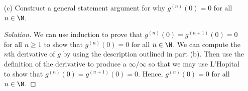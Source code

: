 \begin{enumerate}
\begin{proof}[Solution]
\begin{align*}
            g^{(2)}(x) &= \frac{ 2 e^{-1/x^{2}} }{ x^{6} }  ( 2 - 3x^2  ), \\
            g^{(3)}(x) &= \frac{ 2 e^{-1/x^{2}} }{ x^{9} } ( 4 - 18 x^{2} + 12x^{4} ).
        \end{align*}
        For our \( n \)th derivative, we have that for \( x \neq 0  \)
        \[  g^{(n)}(x) = 
        \begin{cases}
            \frac{ 2 e^{-1/x^{2}} }{ x^{3} } &\text{ if } n=1 \\
            \frac{ 2 e^{-1/x^2 } }{ x^{3n} }  \sum_{ i=0 }^{ n  } (-1)^{i} a_i x^{2i} &\text{ if } n > 1 
        \end{cases} \]
        where \( a_n \in \R  \).
        \end{proof}
    \item[(c)] Construct a general statement argument for why \( g^{(n)}(0) = 0  \) for all \( n \in \N  \).
        \begin{proof}[Solution]
        We can use induction to prove that \( g^{(n)}(0) = g^{(n+1)}(0) = 0  \) for all \( n \geq 1  \) to show that \( g^{(n)}(0) = 0  \) for all \( n \in \N  \). We can compute the \( n \)th derivative of \( g  \) by using the description outlined in part (b). Then use the definition of the  derivative to produce a \( \infty  / \infty   \) so that we may use L'Hopital to show that \( g^{(n)}(0) = g^{(n+1)}(0) = 0 \). Hence, \( g^{(n)}(0) = 0  \) for all \( n \in \N   \).
        \end{proof}
\end{enumerate}


